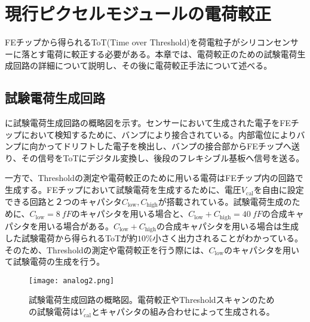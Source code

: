 \chapter{現行ピクセルモジュールの電荷較正}
\label{sec:chap3}

FEチップから得られるToT(Time over Threshold)を荷電粒子がシリコンセンサーに落とす電荷に較正する必要がある。本章では、電荷較正のための試験電荷生成回路の詳細について説明し、その後に電荷較正手法について述べる。

\section{試験電荷生成回路}
\label{sec:analog}
に試験電荷生成回路の概略図を示す。センサーにおいて生成された電子をFEチップにおいて検知するために、バンプにより接合されている。内部電位によりバンプに向かってドリフトした電子を検出し、バンプの接合部からFEチップへ送り、その信号をToTにデジタル変換し、後段のフレキシブル基板へ信号を送る。

一方で、Thresholdの測定や電荷較正のために用いる電荷はFEチップ内の回路で生成する。FEチップにおいて試験電荷を生成するために、電圧$V_\mathrm{cal}$を自由に設定できる回路と２つのキャパシタ$C_\mathrm{low}, C_\mathrm{high}$が搭載されている。試験電荷生成のために、$C_\mathrm{low}=8\ \si{fF}$のキャパシタを用いる場合と、$C_\mathrm{low}+C_\mathrm{high}=40\ \si{fF}$の合成キャパシタを用いる場合がある。$C_\mathrm{low}+C_\mathrm{high}$の合成キャパシタを用いる場合は生成した試験電荷から得られるToTが約$10\%$小さく出力されることがわかっている。そのため、Thresholdの測定や電荷較正を行う際には、$C_\mathrm{low}$のキャパシタを用いて試験電荷の生成を行う。

\begin{figure}[tbp]
  \centering
  \texttt{[image: analog2.png]}
  \caption[試験電荷生成回路の概略図]{試験電荷生成回路の概略図。電荷較正やThresholdスキャンのための試験電荷は$V_\mathrm{cal}$とキャパシタの組み合わせによって生成される。}
  \label{fig:analog}
\end{figure}



